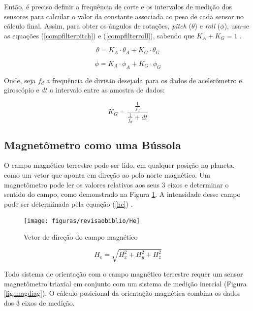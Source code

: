 Então, é preciso definir a frequência de corte e os intervalos de medição dos sensores para calcular o valor da constante associada ao peso de cada sensor no cálculo final. Assim, para obter os ângulos de rotações, \textit{pitch} ($ \theta $) e \textit{roll} ($ \phi $), usa-se as equações (\ref{compfilterpitch}) e (\ref{compfilterroll}), sabendo que $ K_A + K_G = 1 $ \cite{tcc:viniciusPID2Graus}. 


\begin{equation}
	\theta =  K_A \cdot\theta_A + K_G\cdot\theta_G
	\label{compfilterpitch}
\end{equation}

\begin{equation}
	\phi =  K_A \cdot\phi_A + K_G\cdot\phi_G
	\label{compfilterroll}
\end{equation}

Onde, seja $ f_d $ a frequência de divisão desejada para os dados de acelerômetro e giroscópio e $ dt $ o intervalo entre as amostra de dados:

\begin{equation}
	K_G = \dfrac{\frac{1}{f_d}}{\frac{1}{f_d} + dt}
	\label{compfilterroll}
\end{equation}

\subsection{Magnetômetro como uma Bússola}
\label{sec:azimutal}

O campo magnético terrestre pode ser lido, em qualquer posição no planeta, como um vetor que aponta em direção ao polo norte magnético. Um magnetômetro pode ler os valores relativos aos seus 3 eixos e determinar o sentido do campo, como demonstrado na Figura \ref{fig:He}. A intensidade desse campo pode ser determinada pela equação (\ref{he}) \cite{man:Honeywell}.

\begin{figure}[!htb]
	\centering
	\caption{Vetor de direção do campo magnético}
	\texttt{[image: figuras/revisaobiblio/He]}
	\label{fig:He}
\end{figure}

\begin{equation}
	H_e =  \sqrt{H_x^2 + H_y^2 + H_z^2}
	\label{he}
\end{equation}


Todo sistema de orientação com o campo magnético terrestre requer um sensor magnetômetro triaxial em conjunto com um sistema de medição inercial (Figura \ref{fig:magdiag}). O cálculo posicional da orientação magnética combina os dados dos 3 eixos de medição.

